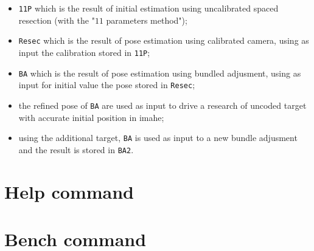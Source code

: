 \begin{itemize}
      \item  {\tt 11P} which is the result of initial estimation using uncalibrated spaced resection
	      (with the "$11$ parameters method");

      \item  {\tt Resec} which is the result of pose estimation using calibrated camera, using as input
	      the calibration stored in {\tt 11P};

      \item  {\tt BA} which is the result of pose estimation using bundled adjusment, using as input
	      for initial value the pose stored in {\tt Resec};

      \item   the refined pose of  {\tt BA} are used as input to drive a research of uncoded target with
	      accurate initial position in imahe;
 
       \item using the additional target, {\tt BA} is used as input to a new bundle adjusment and the result is
             stored in {\tt BA2}.

\end{itemize}




\section{Help command}

\label{HelpCmd}


\section{Bench command}


